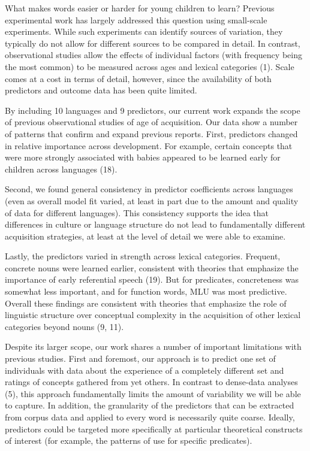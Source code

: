 \documentclass[9pt,twocolumn,twoside]{pnas-new}
\begin{document}
What makes words easier or harder for young children to learn? Previous
experimental work has largely addressed this question using small-scale
experiments. While such experiments can identify sources of variation,
they typically do not allow for different sources to be compared in
detail. In contrast, observational studies allow the effects of
individual factors (with frequency being the most common) to be measured
across ages and lexical categories (1). Scale comes at a cost in terms
of detail, however, since the availability of both predictors and
outcome data has been quite limited.

By including 10 languages and 9 predictors, our current work expands the
scope of previous observational studies of age of acquisition. Our data
show a number of patterns that confirm and expand previous reports.
First, predictors changed in relative importance across development. For
example, certain concepts that were more strongly associated with babies
appeared to be learned early for children across languages (18).

Second, we found general consistency in predictor coefficients across
languages (even as overall model fit varied, at least in part due to the
amount and quality of data for different languages). This consistency
supports the idea that differences in culture or language structure do
not lead to fundamentally different acquisition strategies, at least at
the level of detail we were able to examine.

Lastly, the predictors varied in strength across lexical categories.
Frequent, concrete nouns were learned earlier, consistent with theories
that emphasize the importance of early referential speech (19). But for
predicates, concreteness was somewhat less important, and for function
words, MLU was most predictive. Overall these findings are consistent
with theories that emphasize the role of linguistic structure over
conceptual complexity in the acquisition of other lexical categories
beyond nouns (9, 11).

Despite its larger scope, our work shares a number of important
limitations with previous studies. First and foremost, our approach is
to predict one set of individuals with data about the experience of a
completely different set and ratings of concepts gathered from yet
others. In contrast to dense-data analyses (5), this approach
fundamentally limits the amount of variability we will be able to
capture. In addition, the granularity of the predictors that can be
extracted from corpus data and applied to every word is necessarily
quite coarse. Ideally, predictors could be targeted more specifically at
particular theoretical constructs of interest (for example, the patterns
of use for specific predicates).
\end{document}

